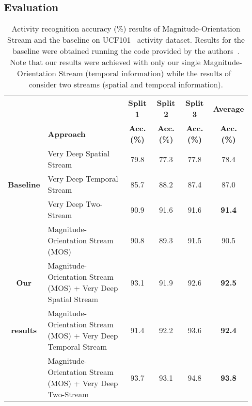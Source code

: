 \documentclass[10pt,conference]{IEEEtran}
\begin{document}
\subsection{Evaluation}

\begin{table*}[th!]
	\centering
	\begin{small}
		\caption{Activity recognition accuracy (\%) results of Magnitude-Orientation Stream and the baseline on UCF101~\cite{Soomro:2012} activity dataset. Results for the baseline were obtained running the code provided by the authors~\cite{Wang:2015}. Note that our results were achieved with only our single Magnitude-Orientation Stream (temporal information) while the results of~\cite{Wang:2015} consider two streams (spatial and temporal information).}
		\begin{tabular}{clp{1.5cm}p{1.5cm}p{1.5cm}p{1.5cm}}
			\toprule
			& & \multicolumn{1}{c}{\textbf{Split 1}} & \multicolumn{1}{c}{\textbf{Split 2}} & \multicolumn{1}{c}{\textbf{Split 3}} & \multicolumn{1}{c}{\textbf{Average}}\vspace{0.075cm}\\
			& \textbf{Approach} & \multicolumn{1}{c}{\textbf{Acc. (\%)}} & \multicolumn{1}{c}{\textbf{Acc. (\%)}} & \multicolumn{1}{c}{\textbf{Acc. (\%)}} & \multicolumn{1}{c}{\textbf{Acc. (\%)}}\\
			\toprule
			& Very Deep Spatial Stream~\cite{Wang:2015} & \multicolumn{1}{c}{79.8} & \multicolumn{1}{c}{77.3} & \multicolumn{1}{c}{77.8} & \multicolumn{1}{c}{78.4} \\
			\multirow{1}{*}{\textbf{Baseline}} & Very Deep Temporal Stream~\cite{Wang:2015} & \multicolumn{1}{c}{85.7} & \multicolumn{1}{c}{88.2} & \multicolumn{1}{c}{87.4} & \multicolumn{1}{c}{87.0} \\ 
			& Very Deep Two-Stream~\cite{Wang:2015} & \multicolumn{1}{c}{90.9} & \multicolumn{1}{c}{91.6} & \multicolumn{1}{c}{91.6} & \multicolumn{1}{c}{\textbf{91.4}} \\
			\midrule
			
			& Magnitude-Orientation Stream (MOS) & \multicolumn{1}{c}{90.8} & \multicolumn{1}{c}{{89.3}} & \multicolumn{1}{c}{91.5} & \multicolumn{1}{c}{{90.5}} \\
			\multirow{1}{*}{\textbf{Our}} & Magnitude-Orientation Stream (MOS) + Very Deep Spatial Stream & \multicolumn{1}{c}{93.1} & \multicolumn{1}{c}{{91.9}} & \multicolumn{1}{c}{92.6} & \multicolumn{1}{c}{{\textbf{92.5}}} \\
			\multirow{1}{*}{\textbf{results}} & Magnitude-Orientation Stream (MOS) + Very Deep Temporal Stream & \multicolumn{1}{c}{91.4} & \multicolumn{1}{c}{{92.2}} & \multicolumn{1}{c}{93.6} & \multicolumn{1}{c}{{\textbf{92.4}}} \\
			& Magnitude-Orientation Stream (MOS) + Very Deep Two-Stream& \multicolumn{1}{c}{93.7} & \multicolumn{1}{c}{{93.1}} & \multicolumn{1}{c}{94.8} & \multicolumn{1}{c}{{\textbf{93.8}}} \\
			\bottomrule
		\end{tabular}
		\label{tab:baseline-comparison}
	\end{small}
\end{table*}
\end{document}
